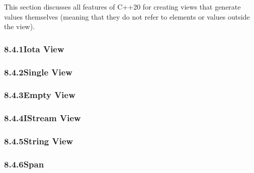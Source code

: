 
This section discusses all features of C++20 for creating views that generate values themselves (meaning that they do not refer to elements or values outside the view).

\subsubsection*{ 8.4.1\hspace{0.2cm}Iota View}


\subsubsection*{ 8.4.2\hspace{0.2cm}Single View}


\subsubsection*{ 8.4.3\hspace{0.2cm}Empty View}


\subsubsection*{ 8.4.4\hspace{0.2cm}IStream View}


\subsubsection*{ 8.4.5\hspace{0.2cm}String View}


\subsubsection*{ 8.4.6\hspace{0.2cm}Span}







